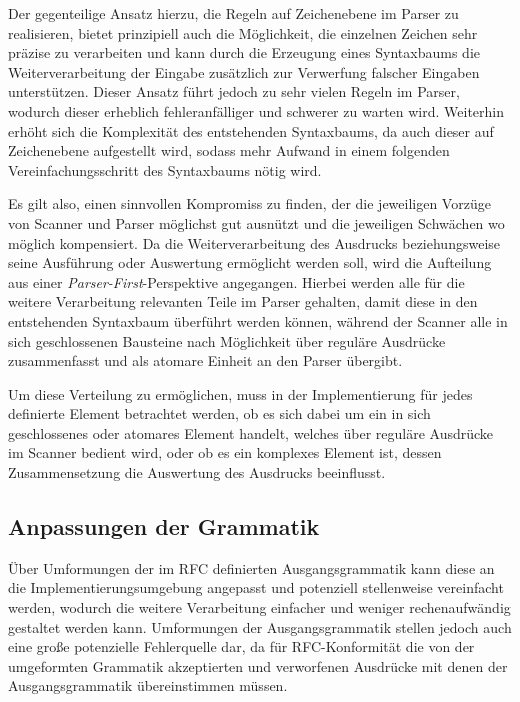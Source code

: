 \documentclass[oneside]{ausarbeitung}
\begin{document}
	Der gegenteilige Ansatz hierzu, die Regeln auf Zeichenebene im Parser zu realisieren, bietet prinzipiell auch die Möglichkeit, die einzelnen Zeichen sehr präzise zu verarbeiten und kann durch die Erzeugung eines Syntaxbaums die Weiterverarbeitung der Eingabe zusätzlich zur Verwerfung falscher Eingaben unterstützen. Dieser Ansatz führt jedoch zu sehr vielen Regeln im Parser, wodurch dieser erheblich fehleranfälliger und schwerer zu warten wird. Weiterhin erhöht sich die Komplexität des entstehenden Syntaxbaums, da auch dieser auf Zeichenebene aufgestellt wird, sodass mehr Aufwand in einem folgenden Vereinfachungsschritt des Syntaxbaums nötig wird.
	
	Es gilt also, einen sinnvollen Kompromiss zu finden, der die jeweiligen Vorzüge von Scanner und Parser möglichst gut ausnützt und die jeweiligen Schwächen wo möglich kompensiert. Da die Weiterverarbeitung des Ausdrucks beziehungsweise seine Ausführung oder Auswertung ermöglicht werden soll, wird die Aufteilung aus einer \textit{Parser-First}-Perspektive angegangen. Hierbei werden alle für die weitere Verarbeitung relevanten Teile im Parser gehalten, damit diese in den entstehenden Syntaxbaum überführt werden können, während der Scanner alle in sich geschlossenen Bausteine nach Möglichkeit über reguläre Ausdrücke zusammenfasst und als atomare Einheit an den Parser übergibt.
	
	Um diese Verteilung zu ermöglichen, muss in der Implementierung für jedes definierte Element betrachtet werden, ob es sich dabei um ein in sich geschlossenes oder atomares Element handelt, welches über reguläre Ausdrücke im Scanner bedient wird, oder ob es ein komplexes Element ist, dessen Zusammensetzung die Auswertung des Ausdrucks beeinflusst.
		
	
	
	\subsection{Anpassungen der Grammatik}
	
	Über Umformungen der im RFC definierten Ausgangsgrammatik kann diese an die Implementierungsumgebung angepasst und potenziell stellenweise vereinfacht werden, wodurch die weitere Verarbeitung einfacher und weniger rechenaufwändig gestaltet werden kann. Umformungen der Ausgangsgrammatik stellen jedoch auch eine große potenzielle Fehlerquelle dar, da für RFC-Konformität die von der umgeformten Grammatik akzeptierten und verworfenen Ausdrücke mit denen der Ausgangsgrammatik übereinstimmen müssen.
	
\end{document}

